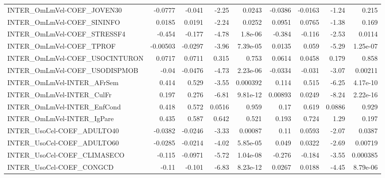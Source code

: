 \begin{tabular}{lrrrrrrrr}
INTER\_OmLmVel-COEF\_JOVEN30            &     -0.0777 &       -0.041 &   -2.25 &   0.0243 &    -0.0386 &     -0.0163 &        -1.24 &         0.215 \\
INTER\_OmLmVel-COEF\_SININFO            &      0.0185 &       0.0191 &   -2.24 &   0.0252 &     0.0951 &      0.0765 &        -1.38 &         0.169 \\
INTER\_OmLmVel-COEF\_STRESSF4           &      -0.454 &       -0.177 &   -4.78 &  1.8e-06 &     -0.384 &      -0.116 &        -2.53 &        0.0114 \\
INTER\_OmLmVel-COEF\_TPROF              &    -0.00503 &      -0.0297 &   -3.96 & 7.39e-05 &     0.0135 &       0.059 &        -5.29 &      1.25e-07 \\
INTER\_OmLmVel-COEF\_USOCINTURON        &      0.0717 &       0.0711 &   0.315 &    0.753 &     0.0614 &      0.0458 &        0.179 &         0.858 \\
INTER\_OmLmVel-COEF\_USODISPMOB         &       -0.04 &      -0.0476 &   -4.73 & 2.23e-06 &    -0.0334 &      -0.031 &        -3.07 &       0.00211 \\
INTER\_OmLmVel-INTER\_AFrSem            &       0.414 &        0.529 &   -3.55 & 0.000392 &      0.114 &       0.515 &        -6.25 &      4.17e-10 \\
INTER\_OmLmVel-INTER\_CulFr             &       0.197 &        0.276 &   -6.81 & 9.81e-12 &    0.00893 &      0.0249 &        -8.24 &      2.22e-16 \\
INTER\_OmLmVel-INTER\_EnfCond           &       0.418 &        0.572 &  0.0516 &    0.959 &       0.17 &       0.619 &       0.0886 &         0.929 \\
INTER\_OmLmVel-INTER\_IgPare            &       0.435 &        0.587 &   0.642 &    0.521 &      0.193 &       0.724 &         1.29 &         0.197 \\
INTER\_UsoCel-COEF\_ADULTO40            &     -0.0382 &      -0.0246 &   -3.33 &  0.00087 &       0.11 &      0.0593 &        -2.07 &        0.0387 \\
INTER\_UsoCel-COEF\_ADULTO60            &     -0.0285 &      -0.0214 &   -4.02 & 5.85e-05 &      0.049 &      0.0322 &        -2.69 &       0.00719 \\
INTER\_UsoCel-COEF\_CLIMASECO           &      -0.115 &      -0.0971 &   -5.72 & 1.04e-08 &     -0.276 &      -0.184 &        -3.55 &      0.000385 \\
INTER\_UsoCel-COEF\_CONGCD              &       -0.11 &       -0.101 &   -6.83 & 8.23e-12 &     0.0267 &      0.0188 &        -4.45 &      8.79e-06 \\

\end{tabular}
